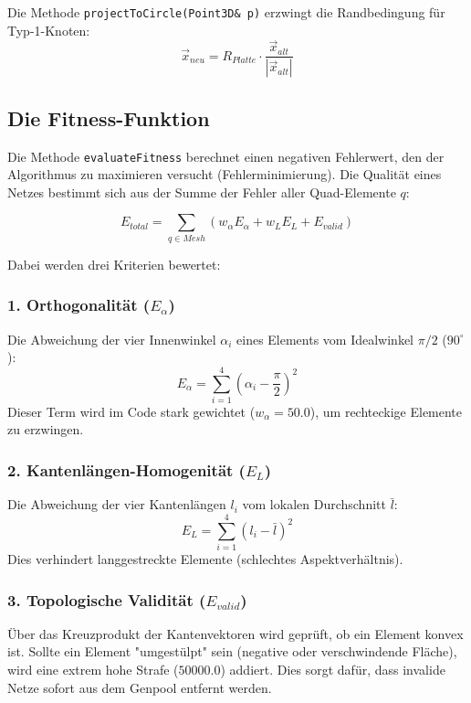 \documentclass[a4paper,12pt]{article}
\begin{document}
Die Methode \texttt{projectToCircle(Point3D\& p)} erzwingt die Randbedingung für Typ-1-Knoten:
\begin{equation}
    \vec{x}_{neu} = R_{Platte} \cdot \frac{\vec{x}_{alt}}{|\vec{x}_{alt}|}
\end{equation}

\subsection{Die Fitness-Funktion}
Die Methode \texttt{evaluateFitness} berechnet einen negativen Fehlerwert, den der Algorithmus zu maximieren versucht (Fehlerminimierung). Die Qualität eines Netzes bestimmt sich aus der Summe der Fehler aller Quad-Elemente $q$:

\begin{equation}
    E_{total} = \sum_{q \in Mesh} (w_{\alpha} E_{\alpha} + w_{L} E_{L} + E_{valid})
\end{equation}

Dabei werden drei Kriterien bewertet:

\subsubsection{1. Orthogonalität ($E_{\alpha}$)}
Die Abweichung der vier Innenwinkel $\alpha_i$ eines Elements vom Idealwinkel $\pi/2$ ($90^\circ$):
\begin{equation}
    E_{\alpha} = \sum_{i=1}^{4} (\alpha_i - \frac{\pi}{2})^2
\end{equation}
Dieser Term wird im Code stark gewichtet ($w_{\alpha} = 50.0$), um rechteckige Elemente zu erzwingen.

\subsubsection{2. Kantenlängen-Homogenität ($E_{L}$)}
Die Abweichung der vier Kantenlängen $l_i$ vom lokalen Durchschnitt $\bar{l}$:
\begin{equation}
    E_{L} = \sum_{i=1}^{4} (l_i - \bar{l})^2
\end{equation}
Dies verhindert langgestreckte Elemente (schlechtes Aspektverhältnis).

\subsubsection{3. Topologische Validität ($E_{valid}$)}
Über das Kreuzprodukt der Kantenvektoren wird geprüft, ob ein Element konvex ist. Sollte ein Element "umgestülpt" sein (negative oder verschwindende Fläche), wird eine extrem hohe Strafe ($50000.0$) addiert. Dies sorgt dafür, dass invalide Netze sofort aus dem Genpool entfernt werden.
\end{document}
